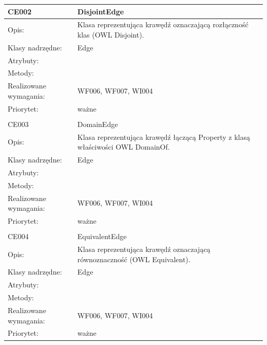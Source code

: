 \begin{center}
\begin{longtable}{|m{3cm}|m{9cm}|}
CE002 & DisjointEdge \\ \hline
Opis: & Klasa reprezentująca krawędź oznaczającą rozłączność klas (OWL Disjoint). \\ \hline
Klasy nadrzędne: & Edge    \\ \hline
Atrybuty: & %
 \\ \hline
Metody: & %
  \\ \hline
Realizowane wymagania: & WF006, WF007, WI004 \\ \hline
Priorytet: & ważne  \\ \hline

\multicolumn{2}{c}{} \\
 \hline

CE003 & DomainEdge  \\ \hline
Opis: & Klasa reprezentująca krawędź łączącą Property z klasą właściwości OWL DomainOf.   \\ \hline
Klasy nadrzędne: & Edge \\ \hline
Atrybuty: & %
 \\ \hline
Metody: & %
  \\ \hline
Realizowane wymagania: & WF006, WF007, WI004 \\ \hline
Priorytet: & ważne  \\ \hline

\multicolumn{2}{c}{} \\
 \hline

CE004 & EquivalentEdge \\ \hline
Opis: & Klasa reprezentująca krawędź oznaczającą równoznaczność (OWL Equivalent).    \\ \hline
Klasy nadrzędne: & Edge    \\ \hline
Atrybuty: & %
 \\ \hline
Metody: & %
  \\ \hline
Realizowane wymagania: & WF006, WF007, WI004 \\ \hline
Priorytet: & ważne  \\ \hline


\end{longtable}
\end{center}
